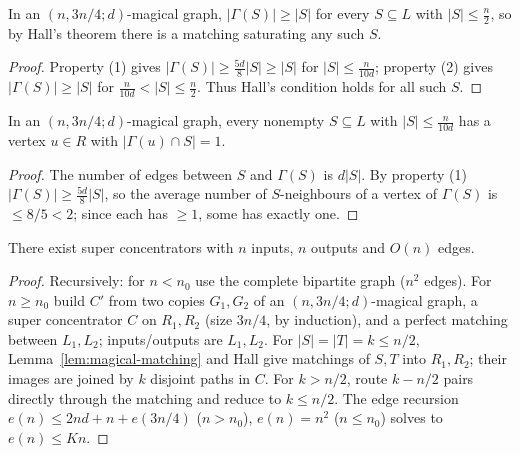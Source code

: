 
\begin{lemma}
  \label{lem:magical-matching}
  In an $(n,3n/4;d)$-magical graph, $|\Gamma(S)|\ge|S|$ for every $S\subseteq L$
  with $|S|\le\tfrac n2$, so by Hall's theorem there is a matching saturating
  any such $S$.
\end{lemma}
\begin{proof}
  Property (1) gives $|\Gamma(S)|\ge\tfrac{5d}8|S|\ge|S|$ for
  $|S|\le\tfrac n{10d}$; property (2) gives $|\Gamma(S)|\ge|S|$ for
  $\tfrac n{10d}<|S|\le\tfrac n2$. Thus Hall's condition holds for all such $S$.
\end{proof}

\begin{lemma}
  \label{lem:unique-neighbour}
  In an $(n,3n/4;d)$-magical graph, every nonempty $S\subseteq L$ with
  $|S|\le\tfrac n{10d}$ has a vertex $u\in R$ with $|\Gamma(u)\cap S|=1$.
\end{lemma}
\begin{proof}
  The number of edges between $S$ and $\Gamma(S)$ is $d|S|$. By property (1)
  $|\Gamma(S)|\ge\tfrac{5d}8|S|$, so the average number of $S$-neighbours of a
  vertex of $\Gamma(S)$ is $\le 8/5<2$; since each has $\ge1$, some has exactly
  one.
\end{proof}

\begin{theorem}
  \label{thm:super-concentrator-linear}
  There exist super concentrators with $n$ inputs, $n$ outputs and $O(n)$ edges.
\end{theorem}
\begin{proof}
  Recursively: for $n<n_0$ use the complete bipartite graph ($n^2$ edges). For
  $n\ge n_0$ build $C'$ from two copies $G_1,G_2$ of an $(n,3n/4;d)$-magical
  graph, a super concentrator $C$ on $R_1,R_2$ (size $3n/4$, by induction), and
  a perfect matching between $L_1,L_2$; inputs/outputs are $L_1,L_2$. For
  $|S|=|T|=k\le n/2$, Lemma~\ref{lem:magical-matching} and Hall give matchings of
  $S,T$ into $R_1,R_2$; their images are joined by $k$ disjoint paths in $C$. For
  $k>n/2$, route $k-n/2$ pairs directly through the matching and reduce to
  $k\le n/2$. The edge recursion $e(n)\le2nd+n+e(3n/4)$ ($n>n_0$), $e(n)=n^2$
  ($n\le n_0$) solves to $e(n)\le Kn$.
\end{proof}

